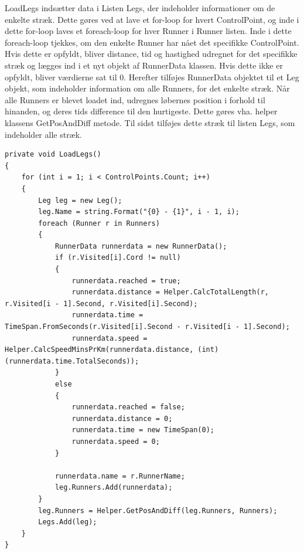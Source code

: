 LoadLegs indsætter data i Listen Legs, der indeholder informationer om de enkelte stræk. Dette gøres ved at lave et for-loop for hvert ControlPoint, og inde i dette for-loop laves et foreach-loop for hver Runner i Runner listen. Inde i dette foreach-loop tjekkes, om den enkelte Runner har nået det specifikke ControlPoint. Hvis dette er opfyldt, bliver distance, tid og hastighed udregnet for det specifikke stræk og lægges ind i et nyt objekt af RunnerData klassen. Hvis dette ikke er opfyldt, bliver værdierne sat til 0. Herefter tilføjes RunnerData objektet til et Leg objekt, som indeholder information om alle Runners, for det enkelte stræk. Når alle Runners er blevet loadet ind, udregnes løbernes position i forhold til hinanden, og deres tids difference til den hurtigeste. Dette gøres vha. helper klassens GetPosAndDiff metode. Til sidst tilføjes dette stræk til listen Legs, som indeholder alle stræk. 

\begin{lstlisting}
private void LoadLegs()
{
    for (int i = 1; i < ControlPoints.Count; i++)
    {
        Leg leg = new Leg();
        leg.Name = string.Format("{0} - {1}", i - 1, i);
        foreach (Runner r in Runners)
        {
            RunnerData runnerdata = new RunnerData();
            if (r.Visited[i].Cord != null)
            {
                runnerdata.reached = true;
                runnerdata.distance = Helper.CalcTotalLength(r, r.Visited[i - 1].Second, r.Visited[i].Second);
                runnerdata.time = TimeSpan.FromSeconds(r.Visited[i].Second - r.Visited[i - 1].Second);
                runnerdata.speed = Helper.CalcSpeedMinsPrKm(runnerdata.distance, (int)(runnerdata.time.TotalSeconds));
            }
            else
            {
                runnerdata.reached = false;
                runnerdata.distance = 0;
                runnerdata.time = new TimeSpan(0);
                runnerdata.speed = 0;
            }

            runnerdata.name = r.RunnerName;
            leg.Runners.Add(runnerdata);
        }
        leg.Runners = Helper.GetPosAndDiff(leg.Runners, Runners);
        Legs.Add(leg);
    }
}
\end{lstlisting}
